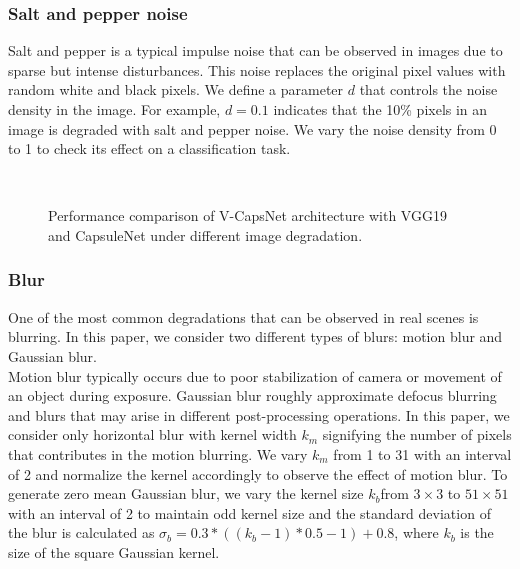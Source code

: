 \documentclass[10pt, journal, compsoc]{IEEEtran}
\begin{document}
\subsubsection{Salt and pepper noise}
Salt and pepper is a typical impulse noise that can be observed in images due to sparse but intense disturbances. This noise replaces the original pixel values with random white and black pixels. We define a parameter $d$ that controls the noise density in the image. For example, $d=0.1$ indicates that the 10\% pixels in an image is degraded with salt and pepper noise. We vary the noise density from 0 to 1 to check its effect on a classification task.
\begin{figure*}
\captionsetup[subfigure]{labelformat=empty}
 \vspace{-3mm}\\
\caption{Performance comparison of V-CapsNet architecture with VGG19 and CapsuleNet under different image degradation.}
\label{fig:result_fusion_model}
\end{figure*}
\subsubsection{Blur}
One of the most common degradations that can be observed in real scenes is blurring. In this paper, we consider two different types of blurs: motion blur and Gaussian blur.\\
Motion blur typically occurs due to poor stabilization of camera or movement of an object during exposure. Gaussian blur roughly approximate defocus blurring and blurs that may arise in different post-processing operations. In this paper, we consider only horizontal blur with kernel width $k_m$ signifying the number of pixels that contributes in the motion blurring. We vary $k_m$ from 1 to 31 with an interval of 2 and normalize the kernel accordingly to observe the effect of motion blur. To generate zero mean Gaussian blur, we vary the kernel size $k_b$from $3\times3$ to $51\times51$ with an interval of 2 to maintain odd kernel size and the standard deviation of the blur is calculated as $\sigma_b = 0.3*((k_b-1)*0.5 - 1) + 0.8$, where $k_b$ is the size of the square Gaussian kernel.
\end{document}
